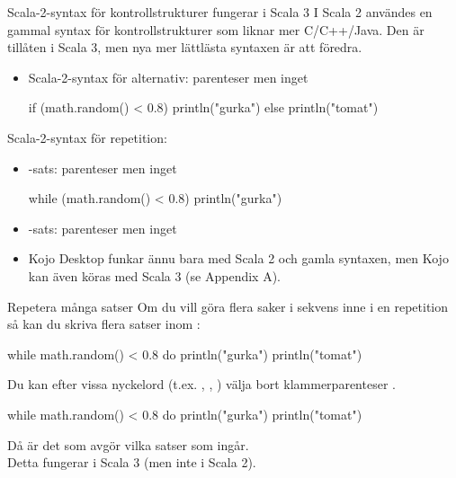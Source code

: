 \begin{Slide}{Scala-2-syntax för kontrollstrukturer fungerar i Scala 3}\SlideFontSmall
I Scala 2 användes en gammal syntax för kontrollstrukturer som liknar mer C/C++/Java. Den är tillåten i Scala 3, men nya mer lättlästa syntaxen är att föredra.
\begin{itemize}
\item Scala-2-syntax för alternativ: parenteser men inget 
\begin{Code}
if (math.random() < 0.8) println("gurka") else println("tomat")
\end{Code}
\end{itemize}

Scala-2-syntax för repetition:
\begin{itemize}
\item {}-sats: parenteser men inget 
\begin{Code}
while (math.random() < 0.8) println("gurka")
\end{Code}

\item {}-sats: parenteser men inget 

\item Kojo Desktop funkar ännu bara med Scala 2 och gamla syntaxen, men Kojo kan även köras med Scala 3 (se Appendix A).

\end{itemize}

\end{Slide}

\begin{Slide}{Repetera många satser}
  \SlideFontSmall
Om du vill göra flera saker i sekvens inne i en repetition så kan du skriva flera satser inom :
\begin{Code}
while math.random() < 0.8 do {
  println("gurka")
  println("tomat")
}
\end{Code}
\pause
Du kan efter vissa nyckelord (t.ex. , , ) välja bort klammerparenteser . 
\begin{Code}
while math.random() < 0.8 do
  println("gurka")
  println("tomat")

\end{Code}
Då är det  som avgör vilka satser som ingår. \\Detta fungerar i Scala 3 (men inte i Scala 2).
\end{Slide}


